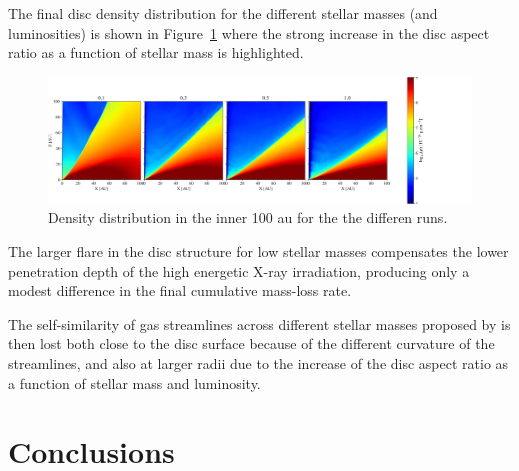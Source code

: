 \documentclass{aa}
\begin{document}
The final disc density distribution for the different stellar masses (and luminosities) is shown in Figure~\ref{fig:discs} where the strong increase in the disc aspect ratio as a function of stellar mass is highlighted.
\begin{figure}
    \centering
    \includegraphics[width=\textwidth]{disc}
    \caption{Density distribution in the inner 100 au for the the differen runs. \label{fig:discs}}
\end{figure}
The larger flare in the disc structure for low stellar masses compensates the lower penetration depth of the high energetic X-ray irradiation, producing only a modest difference in the final cumulative mass-loss rate.

The self-similarity of gas streamlines across different stellar masses proposed by
 is then lost both close to the disc surface because of the different curvature of the streamlines, and also at larger radii due to the increase of the disc aspect ratio as a function of stellar mass and luminosity.


\section{Conclusions}\label{sec:conclusions}
\end{document}
